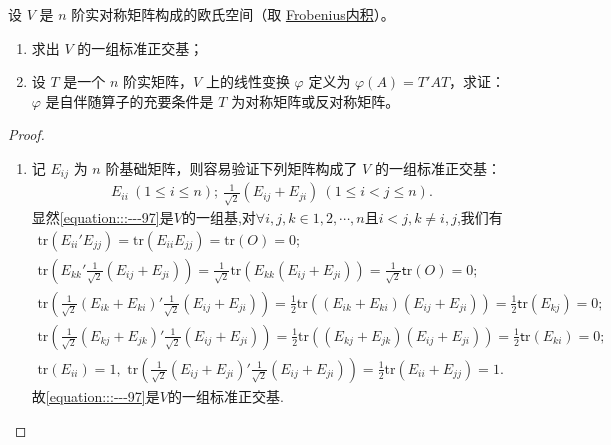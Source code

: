 \documentclass[../../main.tex]{subfiles}
\begin{document}
\begin{proposition}\label{proposition:例9.30}
设 \(V\) 是 \(n\) 阶实对称矩阵构成的欧氏空间（取 \hyperlink{Frobenius 内积}{Frobenius内积}）。
\begin{enumerate}[(1)]
\item 求出 \(V\) 的一组标准正交基；
\item 设 \(T\) 是一个 \(n\) 阶实矩阵，\(V\) 上的线性变换 \(\varphi\) 定义为 \(\varphi(A)=T'AT\)，求证：\(\varphi\) 是自伴随算子的充要条件是 \(T\) 为对称矩阵或反对称矩阵。
\end{enumerate}
\end{proposition}
\begin{proof}
\begin{enumerate}[(1)]
\item 记 \(E_{ij}\) 为 \(n\) 阶基础矩阵，则容易验证下列矩阵构成了 \(V\) 的一组标准正交基：
\begin{align}\label{equation:::---97}
E_{ii}\ (1\leqslant  i\leqslant  n);\ \frac{1}{\sqrt{2}}(E_{ij}+E_{ji})\ (1\leqslant  i < j\leqslant  n).
\end{align}
显然\eqref{equation:::---97}是$V$的一组基,对$\forall i,j,k\in {1,2,\cdots,n}$且$i<j,k\ne i,j$,我们有
\begin{gather*}
\mathrm{tr}\left( E_{ii}'E_{jj} \right) =\mathrm{tr}\left( E_{ii}E_{jj} \right) =\mathrm{tr}\left( O \right) =0;
\\
\mathrm{tr}\left( E_{kk}'\frac{1}{\sqrt{2}}\left( E_{ij}+E_{ji} \right) \right) =\frac{1}{\sqrt{2}}\mathrm{tr}\left( E_{kk}\left( E_{ij}+E_{ji} \right) \right) =\frac{1}{\sqrt{2}}\mathsf{t}\mathrm{r}\left( O \right) =0;
\\
\mathrm{tr}\left( \frac{1}{\sqrt{2}}\left( E_{ik}+E_{ki} \right) ' \frac{1}{\sqrt{2}}\left( E_{ij}+E_{ji} \right) \right) =\frac{1}{2}\mathrm{tr}\left( \left( E_{ik}+E_{ki} \right) \left( E_{ij}+E_{ji} \right) \right) =\frac{1}{2}\mathsf{t}\mathrm{r}\left( E_{kj} \right) =0;
\\
\mathrm{tr}\left( \frac{1}{\sqrt{2}}\left( E_{kj}+E_{jk} \right) ' \frac{1}{\sqrt{2}}\left( E_{ij}+E_{ji} \right) \right) =\frac{1}{2}\mathrm{tr}\left( \left( E_{kj}+E_{jk} \right) \left( E_{ij}+E_{ji} \right) \right) =\frac{1}{2}\mathsf{t}\mathrm{r}\left( E_{ki} \right) =0;
\\
\mathrm{tr}\left( E_{ii} \right) =1,\,\,\mathrm{tr}\left( \frac{1}{\sqrt{2}}\left( E_{ij}+E_{ji} \right) ' \frac{1}{\sqrt{2}}\left( E_{ij}+E_{ji} \right) \right) =\frac{1}{2}\mathrm{tr}\left( E_{ii}+E_{jj} \right) =1.
\end{gather*}
故\eqref{equation:::---97}是$V$的一组标准正交基.


\end{enumerate}
\end{proof}
\end{document}
